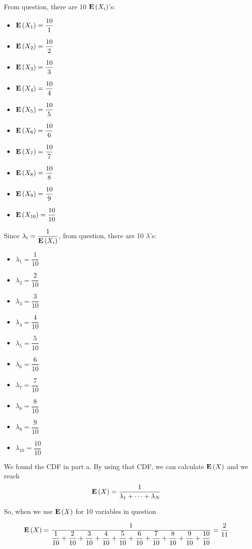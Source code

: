 
From question, there are 10 $\mathbf{E}\left(X_i\right)$'s:
\begin{multicols}{4}
\begin{itemize}
    \item $\mathbf{E}\left(X_1\right) = \dfrac{10}{1}$
    \item $\mathbf{E}\left(X_2\right) = \dfrac{10}{2}$
    \item $\mathbf{E}\left(X_3\right) = \dfrac{10}{3}$
    \item $\mathbf{E}\left(X_4\right) = \dfrac{10}{4}$
    \item $\mathbf{E}\left(X_5\right) = \dfrac{10}{5}$
    \item $\mathbf{E}\left(X_6\right) = \dfrac{10}{6}$
    \item $\mathbf{E}\left(X_7\right) = \dfrac{10}{7}$
    \item $\mathbf{E}\left(X_8\right) = \dfrac{10}{8}$
    \item $\mathbf{E}\left(X_9\right) = \dfrac{10}{9}$
    \item $\mathbf{E}\left(X_{10}\right) = \dfrac{10}{10}$
\end{itemize}
\end{multicols}

Since $\lambda_i = \dfrac{1}{\mathbf{E}\left(X_i\right)}$, from question, there are 10 $\lambda$'s:
\begin{multicols}{5}
\begin{itemize}
    \item $\lambda_1 = \dfrac{1}{10}$
    \item $\lambda_2 = \dfrac{2}{10}$
    \item $\lambda_3 = \dfrac{3}{10}$
    \item $\lambda_4 = \dfrac{4}{10}$
    \item $\lambda_5 = \dfrac{5}{10}$
    \item $\lambda_6 = \dfrac{6}{10}$
    \item $\lambda_7 = \dfrac{7}{10}$
    \item $\lambda_8 = \dfrac{8}{10}$
    \item $\lambda_9 = \dfrac{9}{10}$
    \item $\lambda_{10} = \dfrac{10}{10}$
\end{itemize}
\end{multicols}

We found the CDF in part a. By using that CDF, we can calculate $\mathbf{E}\left(X\right)$ and we reach
\begin{equation*}
    \mathbf{E}\left(X\right) = \frac{1}{\lambda_1 + \cdots + \lambda_N}
\end{equation*}

So, when we use $\mathbf{E}\left(X\right)$ for 10 variables in question

\begin{equation*}
    \mathbf{E}\left(X\right) = \dfrac{1}{\dfrac{1}{10} + \dfrac{2}{10} + \dfrac{3}{10} + \dfrac{4}{10} + \dfrac{5}{10} + \dfrac{6}{10} + \dfrac{7}{10} + \dfrac{8}{10} + \dfrac{9}{10} + \dfrac{10}{10}} = \dfrac{2}{11}
\end{equation*}
